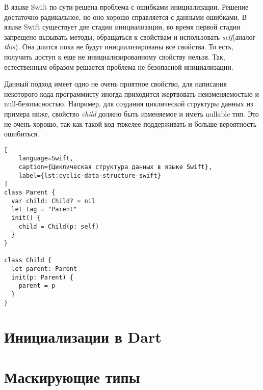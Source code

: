 В языке Swift по сути решена проблема с ошибками инициализации.
Решение достаточно радикальное, но оно хорошо справляется с данными ошибками.
В языке Swift существует две стадии инициализации, во время первой стадии запрещено вызывать методы,
обращаться к свойствам и использовать \emph{self}(аналог \emph{this}).
Она длится пока не будут инициализированы все свойства.
То есть, получить доступ к еще не инициализированному свойству нельзя.
Так, естественным образом решается проблема не безопасной инициализации.

Данный подход имеет одно не очень приятное свойство, для написания некоторого кода программисту иногда приходится жертвовать
неизменяемостью и null-безопасностью.
Например, для создания циклической структуры данных из примера ниже, свойство \emph{child} должно быть изменяемое и иметь nullable тип.
Это не очень хорошо, так как такой код тяжелее поддерживать и больше вероятность ошибиться.
\begin{lstlisting}[
    language=Swift,
    caption={Циклическая структура данных в языке Swift},
    label={lst:cyclic-data-structure-swift}
]
class Parent {
  var child: Child? = nil
  let tag = "Parent"
  init() {
    child = Child(p: self)
  }
}

class Child {
  let parent: Parent
  init(p: Parent) {
    parent = p
  }
}
\end{lstlisting}

\section{Инициализации в Dart}\label{sec:инициализации-в-dart}



\section{Маскирующие типы}\label{sec:маскирующие-типы}

